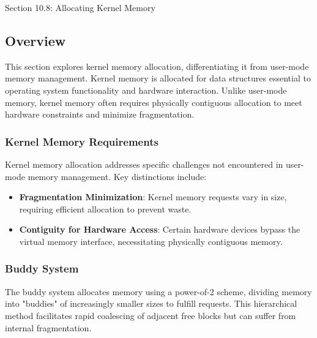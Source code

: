 \begin{notes}{Section 10.8: Allocating Kernel Memory}
    \subsection*{Overview}

    This section explores kernel memory allocation, differentiating it from user-mode memory management. Kernel memory is allocated for data structures essential to operating system functionality and 
    hardware interaction. Unlike user-mode memory, kernel memory often requires physically contiguous allocation to meet hardware constraints and minimize fragmentation.
    
    \subsubsection*{Kernel Memory Requirements}
    
    Kernel memory allocation addresses specific challenges not encountered in user-mode memory management. Key distinctions include:
    
    \begin{highlight}
    
    \begin{itemize}
        \item \textbf{Fragmentation Minimization}: Kernel memory requests vary in size, requiring efficient allocation to prevent waste.
        \item \textbf{Contiguity for Hardware Access}: Certain hardware devices bypass the virtual memory interface, necessitating physically contiguous memory.
    \end{itemize}
    
    \end{highlight}
    
    \subsubsection*{Buddy System}
    
    The buddy system allocates memory using a power-of-2 scheme, dividing memory into "buddies" of increasingly smaller sizes to fulfill requests. This hierarchical method facilitates rapid coalescing 
    of adjacent free blocks but can suffer from internal fragmentation.
    
    \begin{highlight}
    

\end{highlight}
\end{notes}
